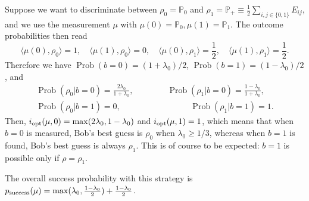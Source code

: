 \documentclass[a4paper]{report}
\newcommand{\PP}{\mathbb{P}}
\DeclareMathOperator{\Prob}{Prob}
\begin{document}
\begin{example}
	Suppose we want to discriminate between $\rho_0=\PP_0$ and $\rho_1=\PP_+\equiv \frac12\sum_{i,j\in\{0,1\}}E_{ij}$, and we use the measurement $\mu$ with $\mu(0)=\PP_0, \mu(1)=\PP_1$.
	The outcome probabilities then read
	\begin{equation}
		\langle \mu(0),\rho_0\rangle = 1,
		\quad
		\langle \mu(1),\rho_0\rangle = 0,
		\quad
		\langle \mu(0),\rho_1\rangle = \frac12,
		\quad
		\langle \mu(1),\rho_1\rangle = \frac12.
	\end{equation}
	Therefore we have
	$\Prob(b=0) = (1+\lambda_0)/2$,
	$\Prob(b=1) = (1-\lambda_0)/2$, and 
	\begin{equation}
	\begin{gathered}
		\Prob(\rho_0|b=0) = \frac{2\lambda_0}{1+\lambda_0},
		\qquad\qquad
		\Prob(\rho_1|b=0) = \frac{1-\lambda_0}{1+\lambda_0}, \\
		\Prob(\rho_0|b=1) = 0,\qquad\qquad\,\,
		\qquad\qquad
		\Prob(\rho_1|b=1) = 1.
	\end{gathered}
	\end{equation}
	Then, $i_{\rm opt}(\mu,0)= \max(2\lambda_0,1-\lambda_0)$
	and $i_{\rm opt}(\mu,1)= 1$, which means that when $b=0$ is measured, Bob's best guess is $\rho_0$ when $\lambda_0\ge1/3$, whereas when $b=1$ is found, Bob's best guess is always $\rho_1$.
	This is of course to be expected: $b=1$ is possible only if $\rho=\rho_1$.

	The overall success probability with this strategy is
	$p_{\rm success}(\mu) = \max(\lambda_0,\frac{1-\lambda_0}{2})+\frac{1-\lambda_0}{2}$.


\end{example}
\end{document}
